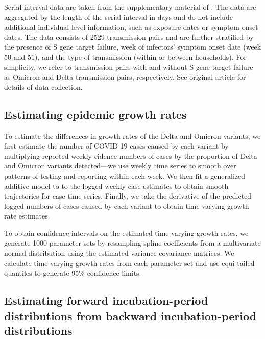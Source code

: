 \documentclass[12pt]{article}
\begin{document}
Serial interval data are taken from the supplementary material of \cite{backer2021omicron}.
The data are aggregated by the length of the serial interval in days and do not include additional individual-level information, such as exposure dates or symptom onset dates.
The data consists of 2529 transmission pairs and are further stratified by the presence of S gene target failure, week of infectors' symptom onset date (week 50 and 51), and the type of transmission (within or between households).
For simplicity, we refer to transmission pairs with and without S gene target failure as Omicron and Delta transmission pairs, respectively.
See original article for details of data collection.

\subsection{Estimating epidemic growth rates}

To estimate the differences in growth rates of the Delta and Omicron variants, we first estimate the number of COVID-19 cases caused by each variant by multiplying reported weekly cidence numbers of cases by the proportion of Delta and Omicron variants detected---we use weekly time series to smooth over patterns of testing and reporting within each week. 
We then fit a generalized additive model \citep{wood2001mgcv} to to the logged weekly case estimates to obtain smooth trajectories for case time series.
Finally, we take the derivative of the predicted logged numbers of cases caused by each variant to obtain time-varying growth rate estimates.

To obtain confidence intervals on the estimated time-varying growth rates, we generate 1000 parameter sets by resampling spline coefficients from a multivariate normal distribution using the estimated variance-covariance matrices.
We calculate time-varying growth rates from each parameter set and use equi-tailed quantiles to generate 95\% confidence limits. 

\subsection{Estimating forward incubation-period distributions from backward incubation-period distributions}
\end{document}
